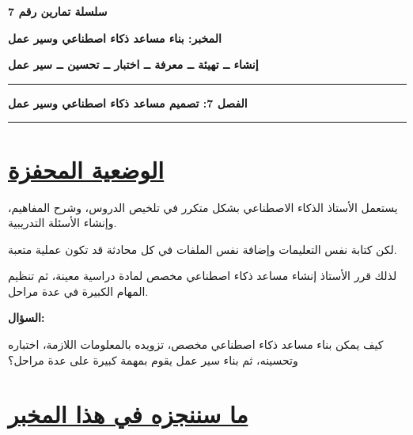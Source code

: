 \documentclass[a4paper]{article}
\begin{document}

\begin{center}

{\Large\khatt\textbf{سلسلة تمارين رقم 7}}

\vspace{0.15cm}

{\Large\khatt\textbf{
المخبر: بناء مساعد ذكاء اصطناعي وسير عمل
}}

\vspace{0.10cm}

{\khatt\textbf{
إنشاء ــ تهيئة ــ معرفة ــ اختبار ــ تحسين ــ سير عمل
}}

\end{center}

\rule{\textwidth}{1pt}

\begin{center}

{\khatt\textbf{
الفصل 7: تصميم مساعد ذكاء اصطناعي وسير عمل
}}

\end{center}

\rule{\textwidth}{1pt}



\section*{\khatt\underline{الوضعية المحفزة}}

يستعمل الأستاذ الذكاء الاصطناعي بشكل متكرر في
تلخيص الدروس، وشرح المفاهيم، وإنشاء الأسئلة
التدريبية.

لكن كتابة نفس التعليمات وإضافة نفس الملفات في كل
محادثة قد تكون عملية متعبة.

لذلك قرر الأستاذ إنشاء مساعد ذكاء اصطناعي مخصص
لمادة دراسية معينة، ثم تنظيم المهام الكبيرة في
عدة مراحل.

\textbf{السؤال:}

كيف يمكن بناء مساعد ذكاء اصطناعي مخصص، تزويده
بالمعلومات اللازمة، اختباره وتحسينه، ثم بناء
سير عمل يقوم بمهمة كبيرة على عدة مراحل؟



\section*{\khatt\underline{ما سننجزه في هذا المخبر}}
\end{document}
